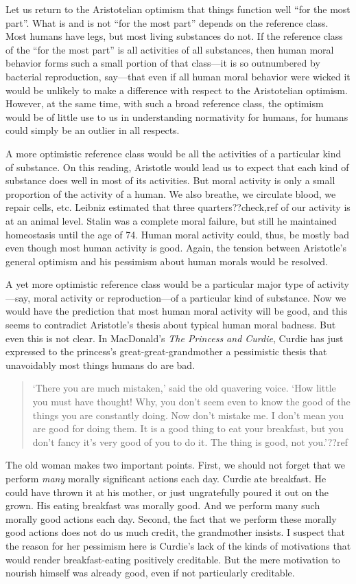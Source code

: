 Let us return to the Aristotelian optimism that things function well ``for the most part''. What is and is not
``for the most part'' depends on the reference class. Most humans have legs, but most living substances do not. 
If the reference class of the ``for the most part'' is all activities of all substances, then human moral behavior
forms such a small portion of that class---it is so outnumbered by bacterial reproduction, say---that even if 
all human moral behavior were wicked it would be unlikely to make a difference with respect to the Aristotelian
optimism. However, at the same time, with such a broad reference class, the optimism would be of little use to us
in understanding normativity for humans, for humans could simply be an outlier in all respects. 

A more optimistic reference class would be all the activities of a particular kind of substance. On this reading, 
Aristotle would lead us to expect that each kind of substance does well in most of its activities. But moral activity
is only a small proportion of the activity of a human. We also breathe, we circulate blood, we repair cells, etc. Leibniz 
estimated that three quarters??check,ref of our activity is at an animal level. Stalin was a complete moral failure, but
still he maintained homeostasis until the age of 74. Human moral activity could, thus, be mostly bad even though most
human activity is good. Again, the tension between Aristotle's general optimism and his pessimism about human morals
would be resolved.

A yet more optimistic reference class would be a particular major type of activity---say, moral activity or reproduction---of
a particular kind of substance. Now we would have the prediction that most human moral activity will be good, and this seems
to contradict Aristotle's thesis about typical human moral badness. But even this is not clear. In MacDonald's 
\textit{The Princess and Curdie}, Curdie has just expressed to the princess's great-great-grandmother a pessimistic thesis that 
unavoidably most things humans do are bad. 
\begin{quote}
`There you are much mistaken,' said the old quavering voice. `How little you must have thought! Why, you don't seem even to 
know the good of the things you are constantly doing. Now don't mistake me. I don't mean you are good for doing them. 
It is a good thing to eat your breakfast, but you don't fancy it's very good of you to do it. The thing is good, not you.'??ref
\end{quote}
The old woman makes two important points. First, we should not forget that we perform \textit{many} morally significant actions
each day. Curdie ate breakfast. He could have thrown it at his mother, or just ungratefully poured it out on the grown.
His eating breakfast was morally good. And we perform many such morally good actions each day. Second, the fact that we
perform these morally good actions does not do us much credit, the grandmother insists. I suspect that the reason for her
pessimism here is Curdie's lack of the kinds of motivations that would render breakfast-eating positively creditable.
But the mere motivation to nourish himself was already good, even if not particularly creditable.

